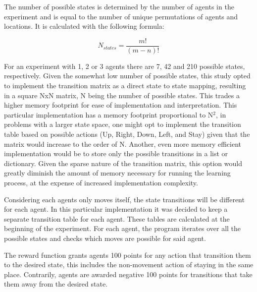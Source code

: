 \documentclass[11pt]{article}
\begin{document}
    The number of possible states is determined by the number of agents in the experiment and is equal to the number of unique permutations of agents and locations. It is calculated with the following formula:

    \begin{equation}
        N_{states} = \dfrac{m!}{(m-n)!}
    \end{equation}

    For an experiment with 1, 2 or 3 agents there are 7, 42 and 210 possible states, respectively. Given the somewhat low number of possible states, this study opted to implement the transition matrix as a direct state to state mapping, resulting in a square NxN matrix, N being the number of possible states. This trades a higher memory footprint for ease of implementation and interpretation. This particular implementation has a memory footprint proportional to N$^2$, in problems with a larger state space, one might opt to implement the transition table based on possible actions (Up, Right, Down, Left, and Stay) given that the matrix would increase to the order of N. Another, even more memory efficient implementation would be to store only the possible transitions in a list or dictionary. Given the sparse nature of the transition matrix, this option would greatly diminish the amount of memory necessary for running the learning process, at the expense of increased implementation complexity.

    Considering each agents only moves itself, the state transitions will be different for each agent. In this particular implementation it was decided to keep a separate transition table for each agent. These tables are calculated at the beginning of the experiment. For each agent, the program iterates over all the possible states and checks which moves are possible for said agent.

    The reward function grants agents 100 points for any action that transition them to the desired state, this includes the non-movement action of staying in the same place. Contrarily, agents are awarded negative 100 points for transitions that take them away from the desired state.
\end{document}
